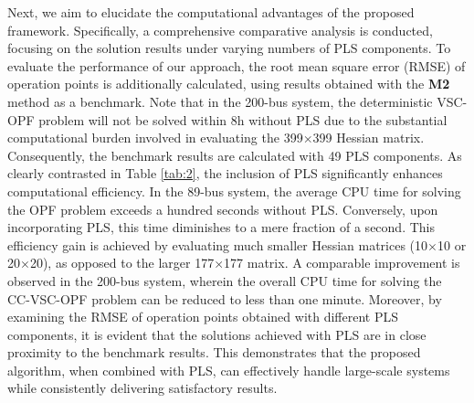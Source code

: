 \documentclass[journal]{IEEEtran}
\theoremstyle{definition}
\theoremstyle{remark}
\begin{document}
Next, we aim to elucidate the computational advantages of the proposed framework. Specifically, a comprehensive comparative analysis is conducted, focusing on the solution results under varying numbers of PLS components. To evaluate the performance of our approach, the root mean square error (RMSE) of operation points is additionally calculated, using results obtained with the \textbf{M2} method as a benchmark. Note that in the 200-bus system, the deterministic VSC-OPF problem will not be solved within 8h without PLS due to the substantial computational burden involved in evaluating the 399$\times$399 Hessian matrix. Consequently, the benchmark results are calculated with 49 PLS components. As clearly contrasted in Table \ref{tab:2}, the inclusion of PLS significantly enhances computational efficiency. In the 89-bus system, the average CPU time for solving the OPF problem exceeds a hundred seconds without PLS. Conversely, upon incorporating PLS, this time diminishes to a mere fraction of a second. This efficiency gain is achieved by evaluating much smaller Hessian matrices (10$\times$10 or 20$\times$20), as opposed to the larger 177$\times$177 matrix. A comparable improvement is observed in the 200-bus system, wherein the overall CPU time for solving the CC-VSC-OPF problem can be reduced to less than one minute.
Moreover, by examining the RMSE of operation points obtained with different PLS components, it is evident that the solutions achieved with PLS are in close proximity to the benchmark results. This demonstrates that the proposed algorithm, when combined with PLS, can effectively handle large-scale systems while consistently delivering satisfactory results. 
\end{document}
